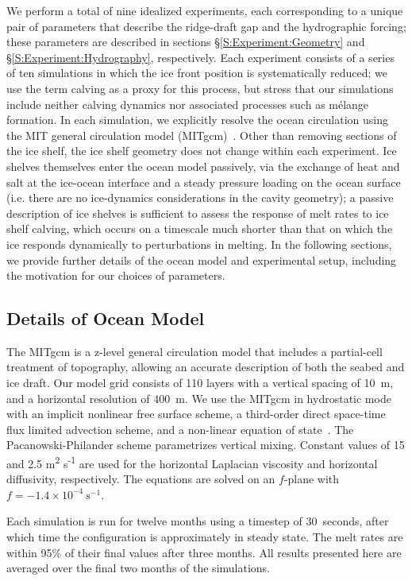 \documentclass[draft]{agujournal2019}
\begin{document}
We perform a total of nine idealized experiments, each corresponding to a unique pair of parameters that describe the ridge-draft gap and the hydrographic forcing; these parameters are described in sections \S\ref{S:Experiment:Geometry} and \S\ref{S:Experiment:Hydrography}, respectively. Each experiment consists of a series of ten simulations in which the ice front position is systematically reduced; we use the term calving as a proxy for this process, but stress that our simulations include neither calving dynamics nor associated processes such as mélange formation. In each simulation, we explicitly resolve the ocean circulation using the MIT general circulation model (MITgcm)~\cite{Marshall1997JGROceans}. Other than removing sections of the ice shelf, the ice shelf geometry does not change within each experiment. Ice shelves themselves enter the ocean model passively, via the exchange of heat and salt at the ice-ocean interface and a steady pressure loading on the ocean surface (i.e. there are no ice-dynamics considerations in the cavity geometry); a passive description of ice shelves is sufficient to assess the response of melt rates to ice shelf calving, which occurs on a timescale much shorter than that on which the ice responds dynamically to perturbations in melting. In the following sections, we provide further details of the ocean model and experimental setup, including the motivation for our choices of parameters.


\subsection{Details of Ocean Model}\label{S:Experiment:Model}
The MITgcm is a z-level general circulation model that includes a partial-cell treatment of topography, allowing an accurate description of both the seabed and ice draft. Our model grid consists of 110 layers with a vertical spacing of 10~m, and a horizontal resolution of 400~m. We use the MITgcm in hydrostatic mode with an implicit nonlinear free surface scheme, a third-order direct space-time flux limited advection scheme, and a non-linear equation of state~\cite{Mcdougall2003JAtmosOceanTech}. The Pacanowski-Philander \cite{Pacanowski1981JPhysOcean} scheme parametrizes vertical mixing. Constant values of 15 and 2.5 
m\textsuperscript{2} s\textsuperscript{-1} are used for the horizontal Laplacian viscosity and horizontal diffusivity, respectively. The equations are solved on an $f$-plane with $f = -1.4\times10^{-4}~\text{s}^{-1}$.

Each simulation is run for twelve months using a timestep of 30~\si{seconds}, after which time the configuration is approximately in steady state. The melt rates are within 95\% of their final values after three months. All results presented here are averaged over the final two months of the simulations.
\end{document}
